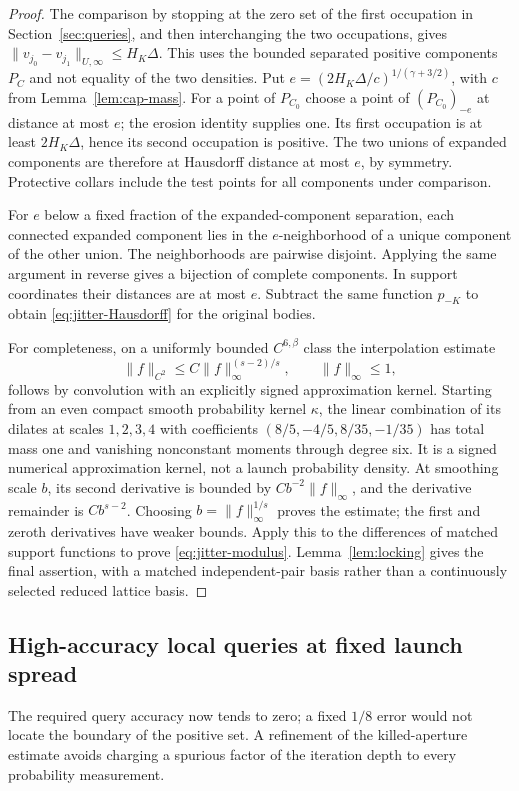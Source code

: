 \begin{proof}
The comparison by stopping at the zero set of the first occupation in
Section~\ref{sec:queries}, and then interchanging the two occupations,
gives
$\|v_{j_0}-v_{j_1}\|_{U,\infty}\le H_K\Delta$.
This uses the bounded separated positive components $P_C$ and not
equality of the two densities. Put
$e=(2H_K\Delta/c)^{1/(\gamma+3/2)}$, with $c$ from
Lemma~\ref{lem:cap-mass}. For a point of $P_{C_0}$ choose a point of
$(P_{C_0})_{-e}$ at distance at most $e$; the erosion identity supplies
one. Its first occupation is at least $2H_K\Delta$, hence its second
occupation is positive. The two unions of expanded components are
therefore at Hausdorff distance at most $e$, by symmetry. Protective
collars include the test points for all components under comparison.

For $e$ below a fixed fraction of the expanded-component separation,
each connected expanded component lies in the $e$-neighborhood of a
unique component of the other union. The neighborhoods are pairwise
disjoint. Applying the same argument in reverse gives a bijection of
complete components. In support coordinates their distances are at
most $e$. Subtract the same function $p_{-K}$ to obtain
\eqref{eq:jitter-Hausdorff} for the original bodies.

For completeness, on a uniformly bounded $C^{6,\beta}$ class the
interpolation estimate
\[
 \|f\|_{C^2}\le C\|f\|_\infty^{(s-2)/s},\qquad
                              \|f\|_\infty\le1,
\]
follows by convolution with an explicitly signed approximation
kernel. Starting from an even compact smooth probability kernel $\kappa$,
the linear combination of its dilates at scales $1,2,3,4$ with
coefficients $(8/5,-4/5,8/35,-1/35)$ has total mass one and vanishing
nonconstant moments through degree six. It is a signed numerical
approximation kernel, not a launch probability density. At smoothing scale $b$, its second
derivative is bounded by $C b^{-2}\|f\|_\infty$, and the derivative
remainder is $C b^{s-2}$. Choosing $b=\|f\|_\infty^{1/s}$ proves
the estimate; the first and zeroth derivatives have weaker bounds.
Apply this to the differences of matched support functions to prove
\eqref{eq:jitter-modulus}. Lemma~\ref{lem:locking} gives the final
assertion, with a matched independent-pair basis rather than a
continuously selected reduced lattice basis.
\end{proof}

\subsection{High-accuracy local queries at fixed launch spread}
The required query accuracy now tends to zero; a fixed $1/8$ error
would not locate the boundary of the positive set. A refinement of the
killed-aperture estimate avoids charging a spurious factor of the
iteration depth to every probability measurement.

